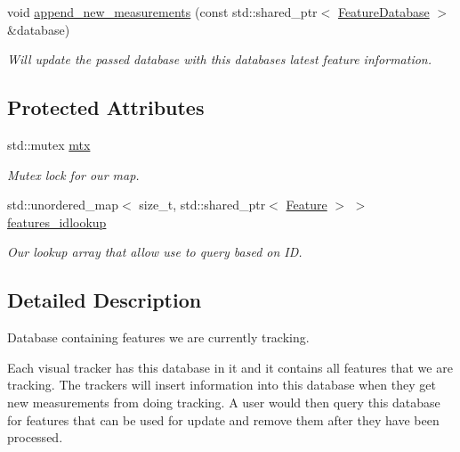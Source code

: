 \begin{DoxyCompactItemize}
\mbox{\label{classov__core_1_1FeatureDatabase_ae4e973b1f5b56efd62ba08df987723bc}} 
void \hyperlink{classov__core_1_1FeatureDatabase_ae4e973b1f5b56efd62ba08df987723bc}{append\+\_\+new\+\_\+measurements} (const std\+::shared\+\_\+ptr$<$ \hyperlink{classov__core_1_1FeatureDatabase}{Feature\+Database} $>$ \&database)
\begin{DoxyCompactList}\small\item\em Will update the passed database with this database\textquotesingle{}s latest feature information. \end{DoxyCompactList}\end{DoxyCompactItemize}
\subsection*{Protected Attributes}
\begin{DoxyCompactItemize}
\item 
\mbox{\label{classov__core_1_1FeatureDatabase_abf963d2ada2d2263d0b9668ab3bb03b0}} 
std\+::mutex \hyperlink{classov__core_1_1FeatureDatabase_abf963d2ada2d2263d0b9668ab3bb03b0}{mtx}
\begin{DoxyCompactList}\small\item\em Mutex lock for our map. \end{DoxyCompactList}\item 
\mbox{\label{classov__core_1_1FeatureDatabase_a132a312f68e252936633bfaf4a1fc044}} 
std\+::unordered\+\_\+map$<$ size\+\_\+t, std\+::shared\+\_\+ptr$<$ \hyperlink{classov__core_1_1Feature}{Feature} $>$ $>$ \hyperlink{classov__core_1_1FeatureDatabase_a132a312f68e252936633bfaf4a1fc044}{features\+\_\+idlookup}
\begin{DoxyCompactList}\small\item\em Our lookup array that allow use to query based on ID. \end{DoxyCompactList}\end{DoxyCompactItemize}


\subsection{Detailed Description}
Database containing features we are currently tracking. 

Each visual tracker has this database in it and it contains all features that we are tracking. The trackers will insert information into this database when they get new measurements from doing tracking. A user would then query this database for features that can be used for update and remove them after they have been processed.



